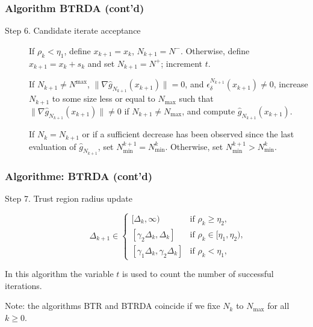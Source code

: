 \documentclass{beamer}
\begin{document}
\begin{frame}
\frametitle{Algorithm BTRDA (cont'd)}

\begin{description}
\item[Step 6. Candidate iterate acceptance]
If $\rho_k < \eta_1$, define $x_{k+1} = x_k$, $N_{k+1} = N^-$.
Otherwise, define $x_{k+1} = x_k + s_k$ and set $N_{k+1} = N^+$;
increment $t$.

\mbox{}

If $N_{k+1} \ne N^{\max}$, $\| \nabla \hat{g}_{N_{k+1}}(x_{k+1})\| = 0$, and
$\epsilon_{\delta}^{N_{k+1}}(x_{k+1}) \ne 0$, increase $N_{k+1}$ to some size less or equal to $N_{\max}$ such that $\| \nabla \hat{g}_{N_{k+1}}(x_{k+1})\| \ne 0$ if $N_{k+1} \ne N_{\max}$, and compute $\hat{g}_{N_{k+1}}(x_{k+1})$.

\mbox{}

If $N_k = N_{k+1}$ or if a sufficient decrease has been observed since the last evaluation of $\hat{g}_{N_{k+1}}$, set $N_{\min}^{k+1} = N_{\min}^k$.
Otherwise, set $N_{\min}^{k+1} > N^k_{\min}$.
\end{description}

\end{frame}

\begin{frame}
\frametitle{Algorithme: BTRDA (cont'd)}

\begin{description}
\item[Step 7. Trust region radius update]
\[
\Delta_{k+1} \in \begin{cases}
[\Delta_k, \infty) & \mbox{if } \rho_k \geq \eta_2, \\
[\gamma_2 \Delta_k, \Delta_k] & \mbox{if } \rho_k \in [\eta_1, \eta_2),\\
[\gamma_1 \Delta_k, \gamma_2 \Delta_k] & \mbox{if } \rho_k < \eta_1,
\end{cases}
\]
\end{description}

\mbox{}

In this algorithm the variable $t$ is used to count the number of successful iterations.

\mbox{}

Note: the algorithms BTR and BTRDA coincide if we fixe $N_k$ to $N_{\max}$ for all $k \geq 0$.

\end{frame}
\end{document}
